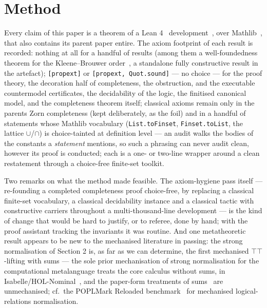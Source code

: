 \section{Method}\label{9-method}

Every claim of this paper is a theorem of a Lean
4~\cite{DeMouraUllrich2021} development~\cite{BeliefArtefact}, over
Mathlib~\cite{MathlibCommunity2020}, that also contains its parent
paper entire. The axiom footprint of each
result is recorded: nothing at all for a handful of results (among them
a well-foundedness theorem for the Kleene--Brouwer
order~\cite{Kechris1995}, a standalone
fully constructive result in the artefact); \texttt{[propext]} or
\texttt{[propext, Quot.sound]} --- no choice --- for the proof theory, the
decoration half of completeness, the obstruction, and the executable
countermodel certificates, the decidability of the logic, the finitised
canonical model, and the completeness theorem itself; classical axioms
remain only in the parent\textquotesingle s Zorn completeness (kept deliberately, as
the foil) and in a handful of statements whose Mathlib vocabulary
(\texttt{List.toFinset}, \texttt{Finset.toList}, the lattice
\ensuremath{\cup}/\ensuremath{\cap}) is choice-tainted at definition level --- an audit
walks the bodies of the constants a \emph{statement} mentions, so such
a phrasing can never audit clean, however its proof is conducted; each
is a one- or two-line wrapper around a clean restatement through a
choice-free finite-set toolkit.

Two remarks on what the method made feasible. The axiom-hygiene pass
itself --- re-founding a completed completeness proof choice-free, by
replacing a classical finite-set vocabulary, a classical decidability
instance and a classical tactic with constructive carriers throughout
a multi-thousand-line development --- is the kind of change that would
be hard to justify, or to referee, done by hand; with the proof
assistant tracking the invariants it was routine. And one metatheoretic
result appears to be new to the mechanised literature in passing: the
strong normalisation of Section 2 is, as far as we can determine, the
first mechanised \ensuremath{\top\top}-lifting with sums --- the sole prior
mechanisation of strong normalisation for the computational
metalanguage treats the core calculus without sums, in
Isabelle/HOL-Nominal~\cite{DoczkalSchwinghammer2009}, and the
paper-form treatments of sums~\cite{Lindley2005,LindleyStark2005} are
unmechanised; cf.\ the POPLMark Reloaded
benchmark~\cite{AbelEtAl2019} for mechanised logical-relations
normalisation.

